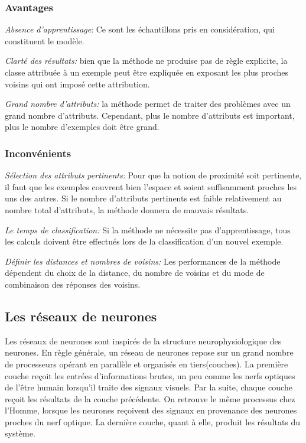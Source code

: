 \subsubsection{Avantages}
\begin{description}
     \item{\textit{Absence d'apprentissage}}: Ce sont les échantillons pris en 
      considération, qui constituent le modèle.
    \item{\textit{Clarté des résultats: }} bien que la méthode ne produise pas de 
        règle explicite, la classe attribuée à un exemple peut être expliquée en
        exposant les plus proches voisins qui ont imposé cette attribution.
       \item{\textit{Grand nombre d'attributs:}} la méthode permet de traiter des
          problèmes avec un grand nombre d'attributs. Cependant, plus le nombre 
          d'attributs est important, plus le nombre d'exemples doit être grand.
      \end{description}

\subsubsection{Inconvénients}
\begin{description}
   \item{\textit{Sélection des attributs pertinents:}} Pour que la notion de proximité
    soit pertinente, il faut que les exemples couvrent bien l'espace et soient 
    suffisamment proches les uns des autres. Si le nombre d'attributs pertinents est
    faible relativement au nombre total d'attributs, la méthode donnera de mauvais 
    résultats.
   \item{\textit{Le temps de classification:}} Si la méthode ne nécessite pas 
    d'apprentissage, tous les calculs doivent être effectués lors de la classification 
    d'un nouvel exemple.
  \item{\textit{Définir les distances et nombres de voisins:}} Les performances de la 
      méthode dépendent du choix de la distance, du nombre de voisins et du mode de 
      combinaison des réponses des voisins.
  \end{description}

\subsection{Les réseaux de neurones}
Les réseaux de neurones sont inspirés de la structure neurophysiologique des
neurones. En règle générale, un réseau de neurones repose sur un grand nombre de
processeurs opérant en parallèle et organisés en tiers(couches). La première
couche reçoit les entrées d’informations brutes, un peu comme les nerfs optiques
de l’être humain lorsqu’il traite des signaux visuels. Par la suite, chaque
couche  reçoit les résultats de la couche précédente.
On retrouve le même processus chez l’Homme, lorsque les neurones reçoivent des
signaux en provenance des neurones proches du nerf optique. La dernière couche,
quant à elle, produit les résultats du système.

